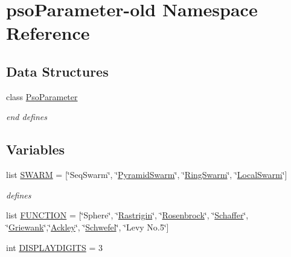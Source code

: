 \hypertarget{namespacepsoParameter-old}{
\section{psoParameter-old Namespace Reference}
\label{namespacepsoParameter-old}
}


\subsection*{Data Structures}
\begin{CompactItemize}
\item 
class \hyperlink{classpsoParameter-old_1_1PsoParameter}{PsoParameter}
\begin{CompactList}\small\item\em end defines \item\end{CompactList}\end{CompactItemize}
\subsection*{Variables}
\begin{CompactItemize}
\item 
list \hyperlink{namespacepsoParameter-old_83f59ee3e05ee716f197192f202ede38}{SWARM} = \mbox{[}\char`\"{}SeqSwarm\char`\"{}, \char`\"{}\hyperlink{classPyramidSwarm}{PyramidSwarm}\char`\"{}, \char`\"{}\hyperlink{classRingSwarm}{RingSwarm}\char`\"{}, \char`\"{}\hyperlink{classLocalSwarm}{LocalSwarm}\char`\"{}\mbox{]}
\begin{CompactList}\small\item\em defines \item\end{CompactList}\item 
list \hyperlink{namespacepsoParameter-old_7c1abf2505a232031f1de65e28db72a1}{FUNCTION} = \mbox{[}\char`\"{}Sphere\char`\"{}, \char`\"{}\hyperlink{classRastrigin}{Rastrigin}\char`\"{}, \char`\"{}\hyperlink{classRosenbrock}{Rosenbrock}\char`\"{}, \char`\"{}\hyperlink{classSchaffer}{Schaffer}\char`\"{}, \char`\"{}\hyperlink{classGriewank}{Griewank}\char`\"{},\char`\"{}\hyperlink{classAckley}{Ackley}\char`\"{}, \char`\"{}\hyperlink{classSchwefel}{Schwefel}\char`\"{}, \char`\"{}Levy No.5\char`\"{}\mbox{]}
\item 
int \hyperlink{namespacepsoParameter-old_7c0ee668254cbad1c14422525b87d033}{DISPLAYDIGITS} = 3
\end{CompactItemize}


